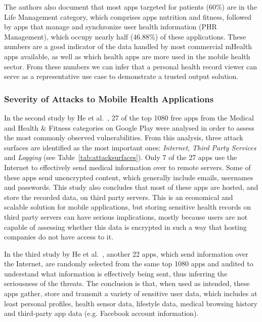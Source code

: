 The authors also document that most apps targeted for patients (60\%) are in the Life Management category, which comprises apps nutrition and fitness, followed by apps that manage and synchronize user health information (\ac{PHR} Management), which occupy nearly half (46.88\%) of these applications. These numbers are a good indicator of the data handled by most commercial mHealth apps available, as well as which health apps are more used in the mobile health sector. From these numbers we can infer that a personal health record viewer can serve as a representative use case to demonstrate a trusted output solution.

\subsubsection{Severity of Attacks to Mobile Health Applications}
In the second study by He et al.~\cite{he2014security}, 27 of the top 1080 free apps from the Medical and Health \& Fitness categories on Google Play were analysed in order to assess the most commonly observed vulnerabilities. From this analysis, three attack surfaces are identified as the most important ones: \emph{Internet}, \emph{Third Party Services} and \emph{Logging} (see Table~\ref{tab:attacksurfaces}). Only 7 of the 27 apps use the Internet to effectively send medical information over to remote servers. Some of these apps send unencrypted content, which generally include emails, usernames and passwords. This study also concludes that most of these apps are hosted, and store the recorded data, on third party servers. This is an economical and scalable solution for mobile applications, but storing sensitive health records on third party servers can have serious implications, mostly because users are not capable of assessing whether this data is encrypted in such a way that hosting companies do not have access to it.

In the third study by He et al.~\cite{he2014security}, another 22 apps, which send information over the Internet, are randomly selected from the same top 1080 apps and audited to understand what information is effectively being sent, thus inferring the seriousness of the threats. The conclusion is that, when used as intended, these apps gather, store and transmit a variety of sensitive user data, which includes at least personal profiles, health sensor data, lifestyle data, medical browsing history and third-party app data (e.g. Facebook account information).

